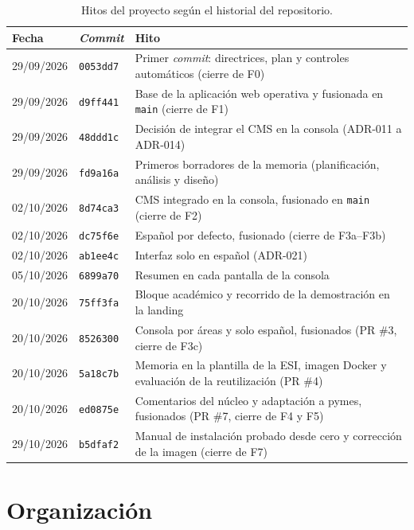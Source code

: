 \begin{table}[htbp]
  \centering
  \small
  \caption{Hitos del proyecto según el historial del repositorio.}
  \label{tab:plan-hitos}
  \begin{tabularx}{\textwidth}{@{}llX@{}}
    \toprule
    \textbf{Fecha} & \textbf{\textit{Commit}} & \textbf{Hito} \\
    \midrule
    29/09/2026 & \texttt{0053dd7} & Primer \textit{commit}: directrices, plan y controles automáticos (cierre de F0) \\
    29/09/2026 & \texttt{d9ff441} & Base de la aplicación web operativa y fusionada en \texttt{main} (cierre de F1) \\
    29/09/2026 & \texttt{48ddd1c} & Decisión de integrar el CMS en la consola (ADR-011 a ADR-014) \\
    29/09/2026 & \texttt{fd9a16a} & Primeros borradores de la memoria (planificación, análisis y diseño) \\
    02/10/2026 & \texttt{8d74ca3} & CMS integrado en la consola, fusionado en \texttt{main} (cierre de F2) \\
    02/10/2026 & \texttt{dc75f6e} & Español por defecto, fusionado (cierre de F3a--F3b) \\
    02/10/2026 & \texttt{ab1ee4c} & Interfaz solo en español (ADR-021) \\
    05/10/2026 & \texttt{6899a70} & Resumen en cada pantalla de la consola \\
    20/10/2026 & \texttt{75ff3fa} & Bloque académico y recorrido de la demostración en la landing \\
    20/10/2026 & \texttt{8526300} & Consola por áreas y solo español, fusionados (PR \#3, cierre de F3c) \\
    20/10/2026 & \texttt{5a18c7b} & Memoria en la plantilla de la ESI, imagen Docker y evaluación de la reutilización (PR \#4) \\
    20/10/2026 & \texttt{ed0875e} & Comentarios del núcleo y adaptación a pymes, fusionados (PR \#7, cierre de F4 y F5) \\
    29/10/2026 & \texttt{b5dfaf2} & Manual de instalación probado desde cero y corrección de la imagen (cierre de F7) \\
    \bottomrule
  \end{tabularx}
\end{table}

\section{Organización}
\label{sec:plan-organizacion}

